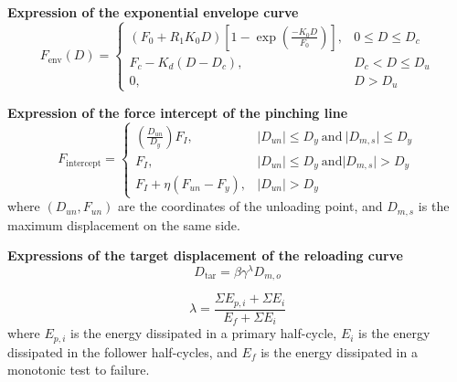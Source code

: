 \documentclass[12pt, landscape]{article}
\begin{document}
\begin{minipage}[t]{0.48\textwidth}
\textbf{Expression of the exponential envelope curve}
\begin{equation}
F_{\mathrm{env}}(D) = 
\begin{cases}
(F_0+R_1 K_0 D)\left[ 1-\exp(\frac{-K_0 D}{F_0}) \right], & 0\leq D \leq D_c \\ 
F_c - K_d (D-D_c), & D_c < D \leq D_u \\ 
0, & D > D_u
\end{cases}
\end{equation}

\textbf{Expression of the force intercept of the pinching line}
\begin{equation}
F_{\mathrm{intercept}} = 
\begin{cases}
\left(\frac{D_{un}}{D_y}\right) F_{I},  & \lvert D_{un} \rvert \leq D_y  \ \mathrm{and} \  \lvert D_{m,s}\rvert \leq D_y \\ 
F_{I},  & \lvert D_{un} \rvert \leq D_y \ \mathrm{and} \lvert D_{m,s} \rvert > D_y \\ 
F_{I} + \eta(F_{un}-F_y), & \lvert D_{un} \rvert > D_y 
\end{cases}
\end{equation}
where $(D_{un}, F_{un})$ are the coordinates of the unloading point, and $D_{m,s}$ is the maximum displacement on the same side.

\textbf{Expressions of the target displacement of the reloading curve}
\begin{equation}
    D_{\mathrm{tar}} = \beta\gamma^{\lambda}D_{m,o}
\end{equation}

\begin{equation}
\lambda = \frac{\Sigma E_{p,i} + \Sigma E_i}{E_f + \Sigma E_i}
\end{equation}
where $E_{p,i}$ is the energy dissipated in a primary half-cycle, $E_i$ is the energy dissipated in the follower half-cycles, and $E_f$ is the energy dissipated in a monotonic test to failure. 
\end{minipage}
\begin{minipage}[t]{0.04\textwidth}
\end{minipage}
\end{document}
